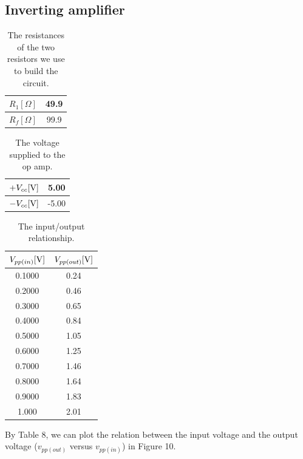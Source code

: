 \documentclass[a4paper]{report}
\begin{document}
	\subsection{Inverting amplifier}
	\begin{table}[H]
		\centering
		\begin{tabular}{|c|c|}
			\hline
			$R_1[\Omega]$&49.9\\
			\hline
			$R_f[\Omega]$&99.9\\
			\hline
		\end{tabular}
		\caption{The resistances of the two resistors we use to build the circuit.}
	\end{table}
	\begin{table}[H]
		\centering
		\begin{tabular}{|c|c|}
			\hline
			$+V_{cc}[\rm{V}]$&5.00\\
			\hline
			$-V_{cc}[\rm{V}]$&-5.00\\
			\hline
		\end{tabular}
		\caption{The voltage supplied to the op amp.}
	\end{table}
	\begin{table}[H]
		\centering
		\begin{tabular}{|c|c|}
			\hline
			$V_{pp(in)}[\rm{V}]$&$V_{pp(out)}[\rm{V}]$\\
			\hline
			0.1000&0.24\\
			\hline
			0.2000&0.46\\
			\hline
			0.3000&0.65\\
			\hline
			0.4000&0.84\\
			\hline
			0.5000&1.05\\
			\hline
			0.6000&1.25\\
			\hline
			0.7000&1.46\\
			\hline
			0.8000&1.64\\
			\hline
			0.9000&1.83\\
			\hline
			1.000&2.01\\
			\hline
		\end{tabular}
		\caption{The input/output relationship.}
	\end{table}
	By Table 8, we can plot the relation between the input voltage and the output voltage ($v_{pp(out)}$ versus $v_{pp(in)}$) in Figure 10.
\end{document}

